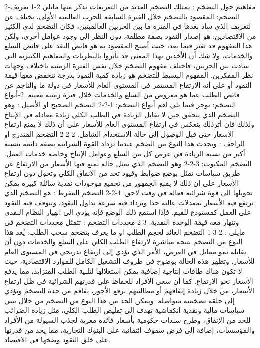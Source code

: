 \documentclass[12pt,a4paper]{report}
\begin{document}
2-مفاهيم حول التضخم :
يمتلك التضخم العديد من التعريفات نذكر منها مايلي 
2-1 تعريف التضخم:
        المقصود بالتضخم خلال الفترة السابقة للحرب العالمية الأولى، يختلف عن لتعريف الذي ساد بعدها في الفترة ما بين الحربين العالميتين، فكان التضخم لدى الكثير من الاقتصادين: هو إصدار النقود بصفة مطلقة، دون النظر إلى وجود عوامل أخرى، ولكن هذا المفهوم قد تغير فيما بعد، حيث أصبح المقصود به هو فائض النقد على فائض السلع والخدمات، ولا شك أن الأخذين بهذا المعنى قد تأثروا بالنظريات والمفاهيم الكينزية التي سادت بين الحربين، فاختلف مفهوم التضخم خلال نفس الفترة الزمنية باختلاف وجهات نظر المفكرين. 
            المفهوم البسيط للتضخم هو زيادة كمية النقود بدرجة تنخفض معها قيمة النقود أو على أنه الارتفاع
المستمر في المستوى العام للأسعار في دولة ما والناجم عن فائض الطلب عما هو معروض من السلع والخدمات خلال فترة زمنية معينة.
2-أنواع التضخم:
نوجز فيما يلي اهم أنواع التضخم: 
1-2-2 التضخم الصحيح او الأصيل : 
وهو التضخم الذي يتحقق حين لا يقابل الزيادة في الطلب الكلي زيادة معادلة في الإنتاج ولذلك فإن أثرذلك ينعكس في ارتفاع المستوى العام للأسعار على أن ذلك لا يمنع ارتفاع الأسعار حتى قبل الوصول إلى حالة الاستخدام الشامل.
2-2-2 التضخم المتدرج او الزاحف : 
ويحدث هذا النوع من الضخم عندما تزداد القوة الشرائية بصفة دائمة بنسبة أكبر من نسبة الزيادة في عرض كل من السلع وعوامل الإنتاج وخاصة خدمات العمل.
  التضخم المكبوت: 3-2-2
وهو التضخم الذي يمثل حالة تمنع فيها الأسعار من الارتفاع عن طريق سياسات تمثل بوضع ضوابط وقيود تحد من الانفاق الكلي وتحول دون ارتفاع الأسعار على ان ذلك لا يمنع الجمهور من تجميع موجودات نقدية سائلة كبيرة يمكن تحويلها الى قوة شرائية فعالة في وقت لاحق.
4-2-2 التضخم المفرط : 
هو التضخم الذي ترتفع فيه الأسعار بمعدلات عالية جدا وتزداد فيه سرعة تداول النقود، وتتوقف فيه النقود على العمل كمستودع للقيم. فإذا استمع ذلك الوضع فإنه يؤدي الى انهيار النظام النقدي وتنهار معه قيمة الوحدة النقدية. 
3-2 محددات التضخم :
تتمثل محددات التضخم في مايلي :
2-3-1 التضخم العائد لحجم الطلب او ما يعرف بتضخم سحب الطلب:
يُعد هذا النوع من التضخم نتيجة مباشرة لارتفاع الطلب الكلي على السلع والخدمات دون أن يقابله نمو مماثل في العرض، الأمر الذي يؤدي إلى ارتفاع تدريجي في المستوى العام للأسعار. وتظهر هذه الحالة بوضوح في ظروف التشغيل الكامل للموارد الاقتصادية، حيث لا تكون هناك طاقات إنتاجية إضافية يمكن استغلالها لتلبية الطلب المتزايد، مما يدفع الأسعار نحو الارتفاع. كما أن سعي الأفراد للحفاظ على قدرتهم الشرائية في ظل ارتفاع الأسعار، من خلال زيادة إنفاقهم أو مطالبتهم برفع الأجور، يفاقم من حدة التضخم ويؤدي إلى حلقة تضخمية متواصلة.
ويمكن الحد من هذا النوع من التضخم من خلال تبني سياسات مالية ونقدية انكماشية تهدف إلى تقليص الطلب الكلي، مثل زيادة الضرائب للحد من الإنفاق، وطرح سندات حكومية بأسعار فائدة مغرية لجذب السيولة من الأفراد والمؤسسات، إضافة إلى فرض سقوف ائتمانية على البنوك التجارية، مما يحد من قدرتها على خلق النقود وضخها في الاقتصاد.
\end{document}
